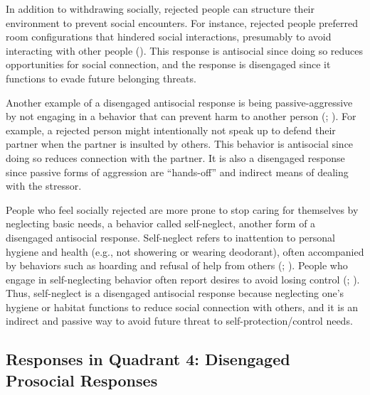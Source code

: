 \documentclass[
]{udthesis}
\begin{document}
In addition to withdrawing socially, rejected people can structure their
environment to prevent social encounters. For instance, rejected people
preferred room configurations that hindered social interactions,
presumably to avoid interacting with other people
(). This response is antisocial since
doing so reduces opportunities for social connection, and the response
is disengaged since it functions to evade future belonging threats.

Another example of a disengaged antisocial response is being
passive-aggressive by not engaging in a behavior that can prevent harm
to another person (; ). For example, a rejected
person might intentionally not speak up to defend their partner when the
partner is insulted by others. This behavior is antisocial since doing
so reduces connection with the partner. It is also a disengaged response
since passive forms of aggression are ``hands-off'' and indirect means of
dealing with the stressor.

People who feel socially rejected are more prone to stop caring for
themselves by neglecting basic needs, a behavior called self-neglect,
another form of a disengaged antisocial response. Self-neglect refers to
inattention to personal hygiene and health (e.g., not showering or
wearing deodorant), often accompanied by behaviors such as hoarding and
refusal of help from others
(; ). People who engage in
self-neglecting behavior often report desires to avoid losing control
(; ). Thus, self-neglect is
a disengaged antisocial response because neglecting one's hygiene or
habitat functions to reduce social connection with others, and it is an
indirect and passive way to avoid future threat to
self-protection/control needs.

\subsection{Responses in Quadrant 4: Disengaged Prosocial Responses}\label{responses-in-quadrant-4-disengaged-prosocial-responses}
\end{document}
